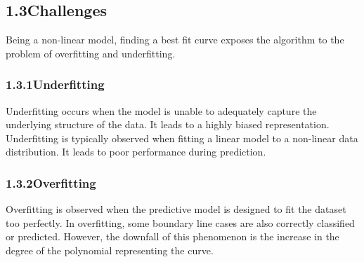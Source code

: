 \documentclass[12pt]{article}
\begin{document}
\vspace{\baselineskip}

\vspace{\baselineskip}
\subsection*{1.3\hspace*{10pt}Challenges}
\begin{justify}
Being a non-linear model, finding a best fit curve exposes the algorithm to the problem of overfitting and underfitting. 
\end{justify}\par


\vspace{\baselineskip}
\subsubsection*{1.3.1\hspace*{10pt}Underfitting }
\begin{justify}
Underfitting occurs when the model is unable to adequately capture the underlying structure of the data. It leads to a highly biased representation. Underfitting is typically observed when fitting a linear model to a non-linear data distribution. It leads to poor performance during prediction.
\end{justify}\par


\vspace{\baselineskip}
\subsubsection*{1.3.2\hspace*{10pt}Overfitting}
\begin{justify}
Overfitting is observed when the predictive model is designed to fit the dataset too perfectly. In overfitting, some boundary line cases are also correctly classified or predicted. However, the downfall of this phenomenon is the increase in the degree of the polynomial representing the curve.
\end{justify}\par
\end{document}
